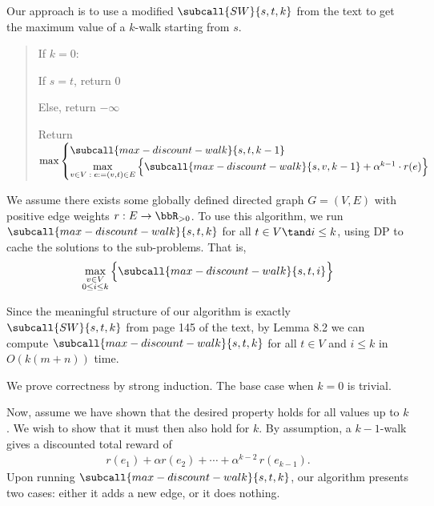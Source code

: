 \documentclass{article}
\begin{document}
\begin{solution} Our approach is to use a modified $\subcall{SW}{s,t,k}$ from the text to get the maximum value of a $k$-walk starting from $s$.

\begin{quote}%

\begin{steps}
  \item If $ k=0 $: \begin{steps}
    \item If $s=t$, return 0
    \item Else, return $-\infty$
\end{steps}
  \item Return $\max\begin{cases}
  \subcall{max-discount-walk}{s,t,k-1}\\
  \max\limits_{v\in V\;:\;e:=(v, t) \in E}\Big\{ \subcall{max-discount-walk}{s,v,k - 1} + \alpha^{k-1}\cdot r(e)\Big\}
  \end{cases}$
\end{steps}
\end{quote}
We assume there exists some globally defined directed graph $G=(V,E)$ with positive edge weights $r:E\to \bbR_{>0}$.
To use this algorithm, we run $\subcall{max-discount-walk}{s,t,k}$ for all $t\in V\tand i\leq k$, using DP to cache the solutions to the sub-problems. That is,
\begin{align}
    \max_{\substack{v\in V\\0\leq i \leq k}} \Big\{\subcall{max-discount-walk}{s,t,i}\Big\} \label{eq:call}
\end{align}

\begin{subproof}[Runtime.]
Since the meaningful structure of our algorithm is exactly $\subcall{SW}{s,t,k}$ from page 145 of the text, by Lemma 8.2 we can compute $\subcall{max-discount-walk}{s,t,k}$ for all $t\in V$ and $i\leq k$ in $O(k(m + n))$ time.
\end{subproof}

\begin{subproof}[Correctness.]
We prove correctness by strong induction.
The base case when $k=0$ is trivial.

Now, assume we have shown that the desired property holds for all values up to $k$.
We wish to show that it must then also hold for $k$.
By assumption, a $k-1$-walk gives a discounted total reward of \begin{align*}
    r(e_1) + \alpha r(e_2)+ \cdots + \alpha^{k-2}\,r(e_{k-1}).
\end{align*}
Upon running $\subcall{max-discount-walk}{s,t,k}$, our algorithm presents two cases: either it adds a new edge, or it does nothing.


\end{subproof}
\end{solution}
\end{document}
